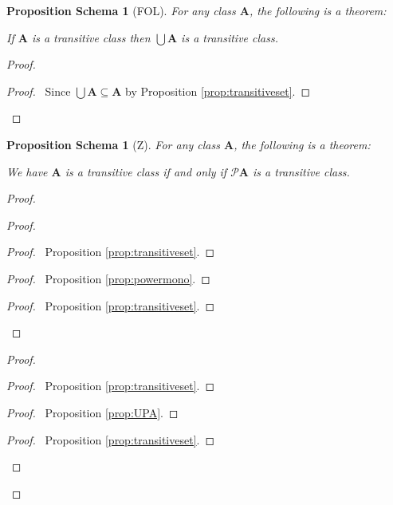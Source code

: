 \documentclass{book}
\let\qed\relax
\newtheorem{props}[ax]{Proposition Schema}
\theoremstyle{definition}
\begin{document}
\begin{props}[FOL]
\label{prop:uniontransitive}
For any class $\mathbf{A}$, the following is a theorem:

If $\mathbf{A}$ is a transitive class then $\bigcup \mathbf{A}$ is a transitive class.
\end{props}

\begin{proof}
\pf
{}
\begin{proof}
	\pf\ Since $\bigcup \mathbf{A} \subseteq \mathbf{A}$ by Proposition \ref{prop:transitiveset}.
\end{proof}
\qed
\end{proof}

\begin{props}[Z]
\label{prop:powtransitive}
For any class $\mathbf{A}$, the following is a theorem:

We have $\mathbf{A}$ is a transitive class if and only if $\mathcal{P} \mathbf{A}$ is a transitive class.
\end{props}

\begin{proof}
\pf
{}
\begin{proof}
	\begin{proof}
		\pf\ Proposition \ref{prop:transitiveset}.
	\end{proof}
	\begin{proof}
		\pf\ Proposition \ref{prop:powermono}.
	\end{proof}
	\begin{proof}
		\pf\ Proposition \ref{prop:transitiveset}.
	\end{proof}
\end{proof}
\begin{proof}
	\begin{proof}
		\pf\ Proposition \ref{prop:transitiveset}.
	\end{proof}
	\begin{proof}
		\pf\ Proposition \ref{prop:UPA}.
	\end{proof}
	\begin{proof}
		\pf\ Proposition \ref{prop:transitiveset}.
	\end{proof}
\end{proof}
\qed
\end{proof}
\end{document}

